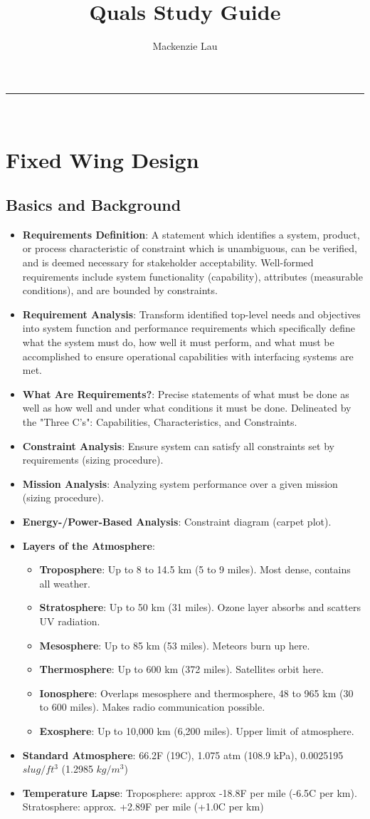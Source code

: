 \documentclass[11pt]{article}
\title{\vspace{-2cm}Quals Study Guide}
\author{Mackenzie Lau}
\date{}
\newcommand{\Hrule}{\rule{\textwidth}{0.2mm}\\}
\newcommand{\Item}[1]{\item \textbf{#1}:}
\begin{document}
\maketitle
\thispagestyle{empty}
\vspace{-1cm}
\Hrule
\vspace{-1cm}
\pagestyle{empty}
\tableofcontents
\newpage
\pagestyle{plain}
\setcounter{page}{1}
\section{Fixed Wing Design}
\subsection{Basics and Background}
\begin{itemize}
\Item{Requirements Definition} A statement which identifies a system, product, or process characteristic of constraint which is unambiguous, can be verified, and is deemed necessary for stakeholder acceptability. Well-formed requirements include system functionality (capability), attributes (measurable conditions), and are bounded by constraints.
\Item{Requirement Analysis} Transform identified top-level needs and objectives into system function and performance requirements which specifically define what the system must do, how well it must perform, and what must be accomplished to ensure operational capabilities with interfacing systems are met.
\Item{What Are Requirements?} Precise statements of what must be done as well as how well and under what conditions it must be done. Delineated by the "Three C's": Capabilities, Characteristics, and Constraints.
\Item{Constraint Analysis} Ensure system can satisfy all constraints set by requirements (sizing procedure).
\Item{Mission Analysis} Analyzing system performance over a given mission (sizing procedure).
\Item{Energy-/Power-Based Analysis} Constraint diagram (carpet plot).
\Item{Layers of the Atmosphere}
	\begin{itemize}
	\Item{Troposphere} Up to 8 to 14.5 km (5 to 9 miles). Most dense, contains all weather.
	\Item{Stratosphere} Up to 50 km (31 miles). Ozone layer absorbs and scatters UV radiation.
	\Item{Mesosphere} Up to 85 km (53 miles). Meteors burn up here.
	\Item{Thermosphere} Up to 600 km (372 miles). Satellites orbit here.
	\Item{Ionosphere} Overlaps mesosphere and thermosphere, 48 to 965 km (30 to 600 miles). Makes radio communication possible.
	\Item{Exosphere} Up to 10,000 km (6,200 miles). Upper limit of atmosphere.
	\end{itemize}
\Item{Standard Atmosphere} 66.2\degree F (19\degree C), 1.075 atm (108.9 kPa), 0.0025195 $slug/ft^3$ (1.2985 $kg/m^3$)
\Item{Temperature Lapse} Troposphere: approx -18.8\degree F per mile (-6.5\degree C per km). Stratosphere: approx. +2.89\degree F per mile (+1.0\degree C per km)
\end{itemize}
\end{document}
